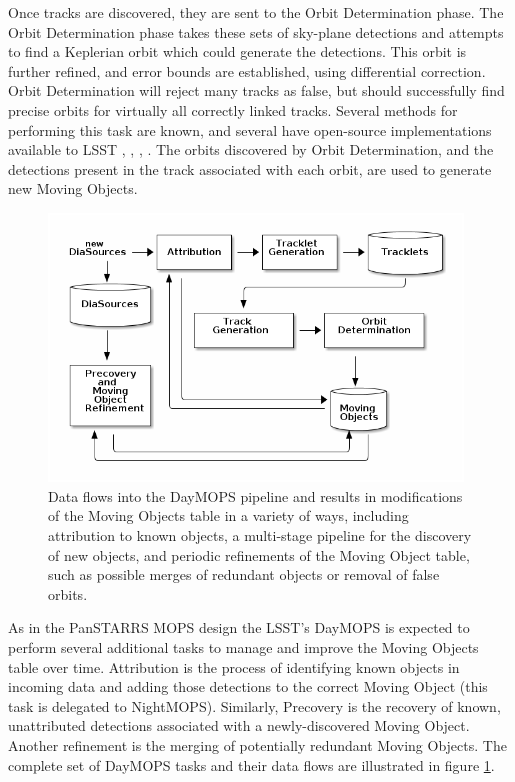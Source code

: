 Once tracks are discovered, they are sent to the Orbit Determination
phase. The Orbit Determination phase takes these sets of sky-plane
detections and attempts to find a Keplerian orbit which could generate
the detections.  This orbit is further refined, and error bounds are
established, using differential correction.  Orbit Determination will
reject many tracks as false, but should successfully find precise
orbits for virtually all correctly linked tracks.  Several methods for
performing this task are known, and several have open-source implementations
available to LSST \citep{Milani04orbitdetermination},
\citep{Milani2006}, \citep{OpenOrb2009}, \citep{granvik_thesis}.  The
orbits discovered by Orbit Determination, and the detections present
in the track associated with each orbit, are used to generate new
Moving Objects.

\begin{figure}[h]
\begin{center}
  \includegraphics[width=11cm]{illustrations/mopsDiagram.png}
\end{center}
\caption{ Data flows into the DayMOPS pipeline and results in
  modifications of the Moving Objects table in a variety of ways,
  including attribution to known objects, a multi-stage pipeline for
  the discovery of new objects, and periodic refinements of the Moving
  Object table, such as possible merges of redundant objects or
  removal of false orbits. }
\label{mopsDiagram}
\end{figure}



As in the PanSTARRS MOPS design \citep{psMOPSDesign} the LSST's
DayMOPS is expected to perform several additional tasks to manage and
improve the Moving Objects table over time.  Attribution is the
process of identifying known objects in incoming data and adding those
detections to the correct Moving Object (this task is delegated to
NightMOPS). Similarly, Precovery is the recovery of known,
unattributed detections associated with a newly-discovered Moving
Object.  Another refinement is the merging of potentially redundant
Moving Objects.  The complete set of DayMOPS tasks and their data
flows are illustrated in figure \ref{mopsDiagram}.










